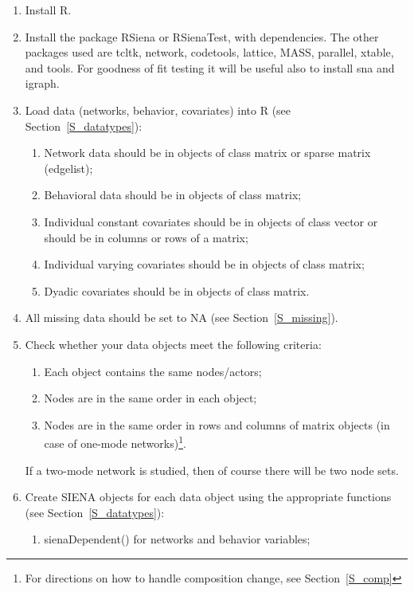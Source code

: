 \documentclass[a4paper,fleqn,11pt]{article}
\newcommand{\+}{\, + \,}
\newcommand{\sfn}[1]{\textsf{#1}}
\newcommand{\R}{{\sf R }}
\newcommand{\Rn}{{\sf R}}
\newcommand{\RS}{{\sf RSiena }}
\newcommand{\SI}{{\sf SIENA }}
\begin{document}
\begin{enumerate}
	\item	Install \Rn.
	\item	Install the package \RS or \sfn{RSienaTest}, with dependencies.
            The other packages used are \sfn{tcltk}, \sfn{network}, \sfn{codetools},
            \sfn{lattice}, \sfn{MASS}, \sfn{parallel}, \sfn{xtable}, and \sfn{tools}.
            For goodness of fit testing it will be useful also to
            install \sfn{sna} and \sfn{igraph}.
	\item	Load data (networks, behavior, covariates) into \R
            (see Section~\ref{S_datatypes}):
	\begin{enumerate}
		\item Network data should be in objects of class matrix or
            sparse matrix (edgelist);
		\item	Behavioral data should be in objects of class matrix;
		\item	Individual constant covariates should be in objects of
            class vector or should be in columns or rows of a matrix;
		\item	Individual varying covariates should be in objects of class matrix;
		\item	Dyadic covariates should be in objects of class matrix.
	\end{enumerate}
	\item	All missing data should be set to NA (see Section~\ref{S_missing}).
	\item Check whether your data objects meet the following criteria:
	\begin{enumerate}
		\item	Each object contains the same nodes/actors;
		\item	Nodes are in the same order in each object;
		\item	Nodes are in the same order in rows and columns of matrix
                objects (in case of one-mode networks)\footnote{For
		directions on how to handle composition change, see Section~\ref{S_comp}}.
	\end{enumerate}
   If a two-mode network is studied, then of course there will
   be two node sets.
	\item	Create \SI objects for each data object using the appropriate
                functions (see Section~\ref{S_datatypes}):
	\begin{enumerate}
		\item	\sfn{sienaDependent()} for networks and behavior variables;

\end{enumerate}
\end{enumerate}
\end{document}
